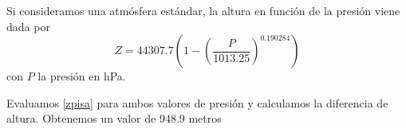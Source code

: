 \documentclass[../main.tex]{subfiles}
\begin{document}
\begin{enumerate}[a)]
Si consideramos una atmósfera estándar, la altura en función de la presión viene dada por
\begin{equation}
    Z = 44307.7 \left( 1 - \left( \frac{P}{1013.25} \right)^{0.190284}  \right) \label{zpisa}
\end{equation}
con $P$ la presión en hPa. 

Evaluamos \eqref{zpisa} para ambos valores de presión y calculamos la diferencia de altura. Obtenemos un valor de 948.9 metros  



\end{enumerate}
\end{document}
